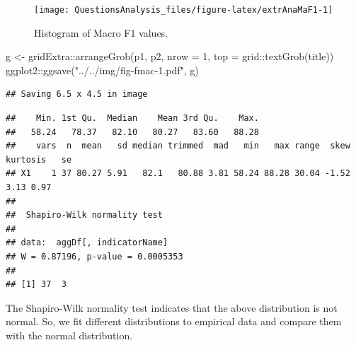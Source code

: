 \documentclass[
]{article}
\newenvironment{Shaded}{\begin{snugshade}}{\end{snugshade}}
\newcommand{\AttributeTok}[1]{\textcolor[rgb]{0.77,0.63,0.00}{#1}}
\newcommand{\DecValTok}[1]{\textcolor[rgb]{0.00,0.00,0.81}{#1}}
\newcommand{\FunctionTok}[1]{\textcolor[rgb]{0.00,0.00,0.00}{#1}}
\newcommand{\NormalTok}[1]{#1}
\newcommand{\OtherTok}[1]{\textcolor[rgb]{0.56,0.35,0.01}{#1}}
\newcommand{\SpecialCharTok}[1]{\textcolor[rgb]{0.00,0.00,0.00}{#1}}
\newcommand{\StringTok}[1]{\textcolor[rgb]{0.31,0.60,0.02}{#1}}
\begin{document}
\begin{figure}

{\centering \texttt{[image: QuestionsAnalysis\_files/figure-latex/extrAnaMaF1-1]} 

}

\caption{Histogram of Macro F1 values.}\label{fig:extrAnaMaF1}
\end{figure}

\begin{Shaded}
\begin{Highlighting}[]
\NormalTok{g }\OtherTok{\textless{}{-}}\NormalTok{ gridExtra}\SpecialCharTok{::}\FunctionTok{arrangeGrob}\NormalTok{(p1, p2, }\AttributeTok{nrow =} \DecValTok{1}\NormalTok{, }\AttributeTok{top =}\NormalTok{ grid}\SpecialCharTok{::}\FunctionTok{textGrob}\NormalTok{(title))}
\NormalTok{ggplot2}\SpecialCharTok{::}\FunctionTok{ggsave}\NormalTok{(}\StringTok{"../../img/fig{-}fmac{-}1.pdf"}\NormalTok{, g)}
\end{Highlighting}
\end{Shaded}

\begin{verbatim}
## Saving 6.5 x 4.5 in image
\end{verbatim}

\begin{Shaded}
\end{Shaded}

\begin{verbatim}
##    Min. 1st Qu.  Median    Mean 3rd Qu.    Max. 
##   58.24   78.37   82.10   80.27   83.60   88.28 
##    vars  n  mean   sd median trimmed  mad   min   max range  skew kurtosis   se
## X1    1 37 80.27 5.91   82.1   80.88 3.81 58.24 88.28 30.04 -1.52     3.13 0.97
## 
##  Shapiro-Wilk normality test
## 
## data:  aggDf[, indicatorName]
## W = 0.87196, p-value = 0.0005353
## 
## [1] 37  3
\end{verbatim}

The Shapiro-Wilk normality test indicates that the above distribution is not normal. So, we fit different distributions to empirical data and compare them with the normal distribution.

\begin{Shaded}
\end{Shaded}
\end{document}
